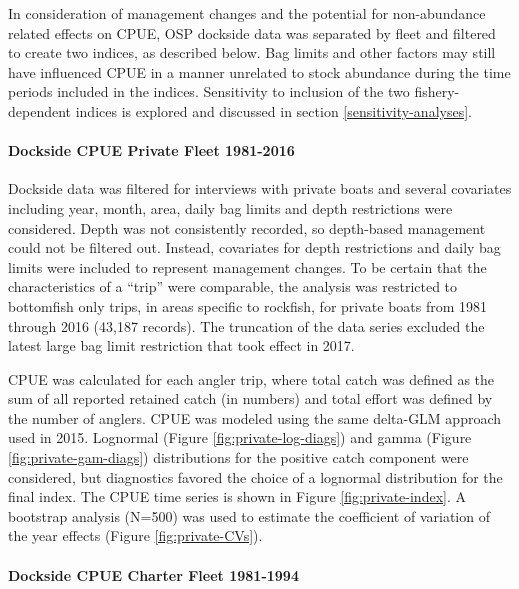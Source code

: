 \documentclass[11pt,
  english,
  letterpaper,
]{article}
\begin{document}
In consideration of management changes and the potential for non-abundance related effects on CPUE, OSP dockside data was separated by fleet and filtered to create two indices, as described below. Bag limits and other factors may still have influenced CPUE in a manner unrelated to stock abundance during the time periods included in the indices. Sensitivity to inclusion of the two fishery-dependent indices is explored and discussed in section \ref{sensitivity-analyses}.

\hypertarget{dockside-cpue-private-fleet-1981-2016}{%
\paragraph{Dockside CPUE Private Fleet 1981-2016}\label{dockside-cpue-private-fleet-1981-2016}}

Dockside data was filtered for interviews with private boats and several covariates including year, month, area, daily bag limits and depth restrictions were considered. Depth was not consistently recorded, so depth-based management could not be filtered out. Instead, covariates for depth restrictions and daily bag limits were included to represent management changes. To be certain that the characteristics of a ``trip'' were comparable, the analysis was restricted to bottomfish only trips, in areas specific to rockfish, for private boats from 1981 through 2016 (43,187 records). The truncation of the data series excluded the latest large bag limit restriction that took effect in 2017.

CPUE was calculated for each angler trip, where total catch was defined as the sum of all reported retained catch (in numbers) and total effort was defined by the number of anglers. CPUE was modeled using the same delta-GLM approach used in 2015. Lognormal (Figure \ref{fig:private-log-diags}) and gamma (Figure \ref{fig:private-gam-diags}) distributions for the positive catch component were considered, but diagnostics favored the choice of a lognormal distribution for the final index. The CPUE time series is shown in Figure \ref{fig:private-index}. A bootstrap analysis (N=500) was used to estimate the coefficient of variation of the year effects (Figure \ref{fig:private-CVs}).

\hypertarget{dockside-cpue-charter-fleet-1981-1994}{%
\paragraph{Dockside CPUE Charter Fleet 1981-1994}\label{dockside-cpue-charter-fleet-1981-1994}}
\end{document}
